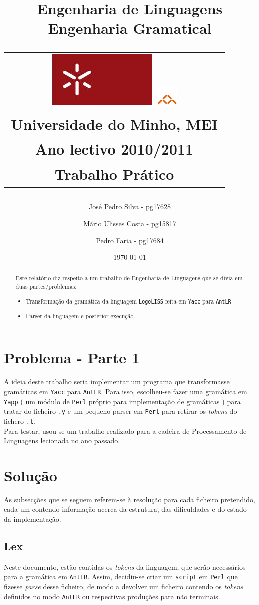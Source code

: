 \documentclass[11pt,a4paper]{article}
\title{\sf  Engenharia de Linguagens \\ Engenharia Gramatical \\
\begin{tabular}{c}
    \includegraphics[width=.1\textwidth]{stuff/uminho.jpg}
    \includegraphics[width=.07\textwidth]{stuff/informatica.jpg}\\
    {\small Universidade do Minho}, {\small MEI}\\
    {\small Ano lectivo 2010/2011}\\
    {\small Trabalho Prático}\\
\end{tabular}
}
\author{
    {\small José Pedro Silva - pg17628} \and
    {\small Mário Ulisses Costa - pg15817} \and
    {\small Pedro Faria - pg17684}}
\date{{\small \today}}
\begin{document}
\maketitle

\begin{abstract}
Este relatório diz respeito a um trabalho de Engenharia de Linguagens que se divia em duas partes/problemas:
\begin{itemize}
 \item Transformação da gramática da linguagem \texttt{LogoLISS} feita em \texttt{Yacc} para \texttt{AntLR} 
 \item Parser da linguagem e posterior execução.
\end{itemize}

\end{abstract}

\tableofcontents

\newpage
\section{Problema - Parte 1}
A ideia deste trabalho seria implementar um programa que transformasse gramáticas em \texttt{Yacc} para \texttt{AntLR}. Para isso, escolheu-se fazer uma gramática em 
\texttt{Yapp} ( um módulo de \texttt{Perl} próprio para implementação de gramáticas ) para tratar do ficheiro \texttt{.y} e um pequeno parser em \texttt{Perl} para retirar os 
\emph{tokens} do fichero \texttt{.l}. \\

Para testar, usou-se um trabalho realizado para a cadeira de Processamento de Linguagens lecionada no ano passado. 

\section{Solução}

As subsecções que se seguem referem-se à resolução para cada ficheiro pretendido, cada um contendo informação acerca da estrutura, das dificuldades e 
do estado da implementação.

\subsection{Lex}
Neste documento, estão contidas os \emph{tokens} da linguagem, que serão necessários para a gramática em \texttt{AntLR}. Assim, decidiu-se criar um \texttt{script} em \texttt{Perl}
que fizesse \emph{parse} desse ficheiro, de modo a devolver um ficheiro contendo os \emph{tokens} definidos no modo \texttt{AntLR} ou respectivas produções para não terminais.
\end{document}
